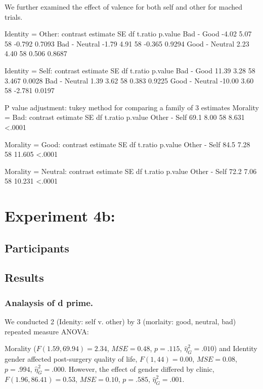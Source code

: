 \documentclass[man]{apa6}
\begin{document}
We further examined the effect of valence for both self and other for mached trials.

Identity = Other:
contrast estimate SE df t.ratio p.value
Bad - Good -4.02 5.07 58 -0.792 0.7093
Bad - Neutral -1.79 4.91 58 -0.365 0.9294
Good - Neutral 2.23 4.40 58 0.506 0.8687

Identity = Self:
contrast estimate SE df t.ratio p.value
Bad - Good 11.39 3.28 58 3.467 0.0028
Bad - Neutral 1.39 3.62 58 0.383 0.9225
Good - Neutral -10.00 3.60 58 -2.781 0.0197

P value adjustment: tukey method for comparing a family of 3 estimates
Morality = Bad:
contrast estimate SE df t.ratio p.value
Other - Self 69.1 8.00 58 8.631 \textless{}.0001

Morality = Good:
contrast estimate SE df t.ratio p.value
Other - Self 84.5 7.28 58 11.605 \textless{}.0001

Morality = Neutral:
contrast estimate SE df t.ratio p.value
Other - Self 72.2 7.06 58 10.231 \textless{}.0001

\hypertarget{experiment-4b}{%
\section{Experiment 4b:}\label{experiment-4b}}

\hypertarget{participants-5}{%
\subsection{Participants}\label{participants-5}}

\hypertarget{results-5}{%
\subsection{Results}\label{results-5}}

\hypertarget{analaysis-of-d-prime.-4}{%
\subsubsection{Analaysis of d prime.}\label{analaysis-of-d-prime.-4}}

We conducted 2 (Idenity: self v. other) by 3 (morlaity: good, neutral, bad) repeated measure ANOVA:

Morality (\(F(1.59, 69.94) = 2.34\), \(\mathit{MSE} = 0.48\), \(p = .115\), \(\hat{\eta}^2_G = .010\)) and Identity gender affected post-surgery quality of life, \(F(1, 44) = 0.00\), \(\mathit{MSE} = 0.08\), \(p = .994\), \(\hat{\eta}^2_G = .000\). However, the effect of gender differed by clinic, \(F(1.96, 86.41) = 0.53\), \(\mathit{MSE} = 0.10\), \(p = .585\), \(\hat{\eta}^2_G = .001\).
\end{document}
